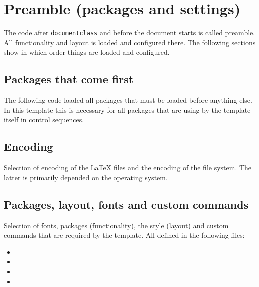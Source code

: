 \section{Preamble (packages and settings)}
The code after \texttt{documentclass} and before the document starts is called preamble. All functionality and layout is loaded and configured there. The following sections show in which order things are loaded and configured.

\subsection{Packages that come first}
The following code loaded all packages that must be loaded before anything else. In this template this is necessary for all packages that are using by the template itself in control sequences.

\subsection{Encoding}
Selection of encoding of the LaTeX files and the encoding of the file system. The latter is primarily depended on the operating system.

\subsection{Packages, layout, fonts and custom commands}
Selection of fonts, packages (functionality), the style (layout) and custom 
commands that are required by the template. All defined in the following files:
%
\begin{itemize}[noitemsep]
\item {}
\item {}
\item {}
\item {}
\end{itemize}


